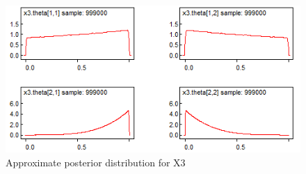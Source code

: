 \documentclass[12pt]{article} %
\begin{document}
\begin{figure}[h!]
  \centering
  \includegraphics[width=\linewidth]{bugs_graphs/x3_2.png}
  \caption{Approximate posterior distribution for X3}
  \label{fig:X3_2 Posterior}
\end{figure}

\clearpage

\printbibliography 
\end{document}
